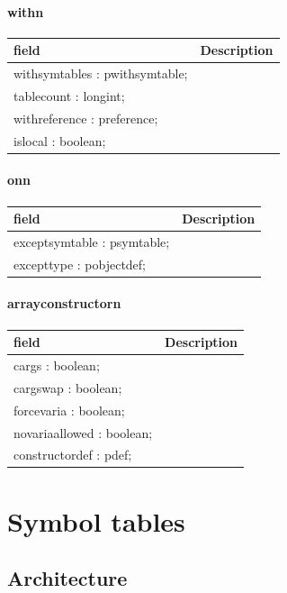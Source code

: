 \documentclass [12pt]{article}
\begin{document}
\paragraph{withn}\mbox{}

\begin{longtable}{|l|p{10cm}|}
\hline
field	& Description \\
\hline
\endhead
\hline
\endfoot
\textsf{withsymtables : pwithsymtable;} &  \\
\textsf{tablecount : longint;}		&  \\
\textsf{withreference : preference;}	&  \\
\textsf{islocal : boolean;}		&  
\label{tab32}
\end{longtable}

\paragraph{onn}\mbox{}

\begin{longtable}{|l|p{10cm}|}
\hline
field	& Description \\
\hline
\endhead
\hline
\endfoot
\textsf{exceptsymtable : psymtable;}&  \\
\textsf{excepttype : pobjectdef;}&  
\label{tab33}
\end{longtable}

\paragraph{arrayconstructorn}\mbox{}

\begin{longtable}{|l|p{10cm}|}
\hline
field	& Description \\
\hline
\endhead
\hline
\endfoot
\textsf{cargs : boolean;}		&  \\
\textsf{cargswap : boolean;}		&  \\
\textsf{forcevaria : boolean;}		&  \\
\textsf{novariaallowed : boolean;}	&  \\
\textsf{constructordef : pdef;}		&  
\label{tab34}
\end{longtable}

\section{Symbol tables}
\label{sec:symbol}

\subsection{Architecture}
\label{subsec:architecturesructord}
\end{document}
